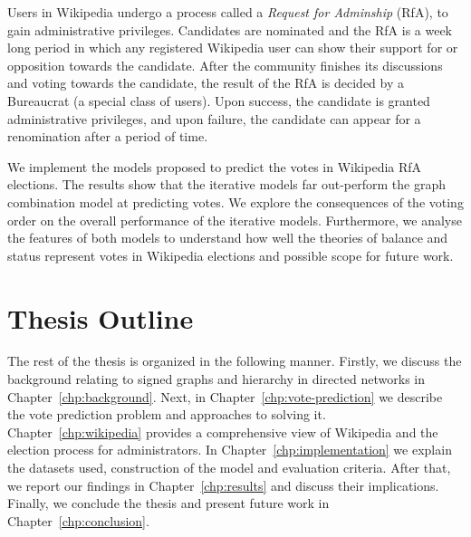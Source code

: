 Users in Wikipedia undergo a process called a \textit{Request for Adminship} (RfA), to gain administrative privileges.
Candidates are nominated and the RfA is a week long period in which any registered Wikipedia user can show their support for or opposition towards the candidate.
After the community finishes its discussions and voting towards the candidate, the result of the RfA is decided by a Bureaucrat (a special class of users).
Upon success, the candidate is granted administrative privileges, and upon failure, the candidate can appear for a renomination after a period of time.

We implement the models proposed to predict the votes in Wikipedia RfA elections.
The results show that the iterative models far out-perform the graph combination model at predicting votes.
We explore the consequences of the voting order on the overall performance of the iterative models.
Furthermore, we analyse the features of both models to understand how well the theories of balance and status represent votes in Wikipedia elections and possible scope for future work.

\section{Thesis Outline}
The rest of the thesis is organized in the following manner. Firstly, we discuss the background relating to signed graphs and hierarchy in directed networks in Chapter~\ref{chp:background}. Next, in Chapter~\ref{chp:vote-prediction} we describe the vote prediction problem and approaches to solving it. Chapter~\ref{chp:wikipedia} provides a comprehensive view of Wikipedia and the election process for administrators. In Chapter~\ref{chp:implementation} we explain the datasets used, construction of the model and evaluation criteria. After that, we report our findings in Chapter~\ref{chp:results} and discuss their implications. Finally, we conclude the thesis and present future work in Chapter~\ref{chp:conclusion}.